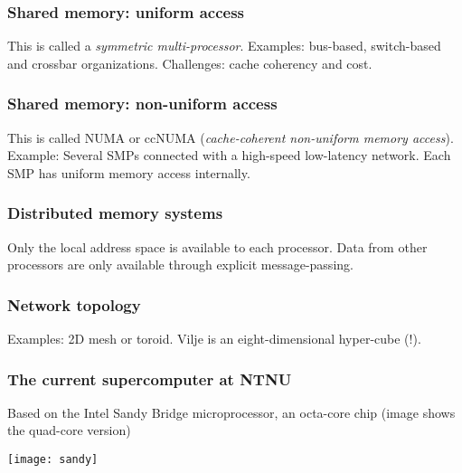 \begin{frame}
  \frametitle{Shared memory: uniform access}
  This is called a \emph{symmetric multi-processor}. Examples: bus-based,
  switch-based and crossbar organizations. Challenges: cache coherency and cost.
  \begin{center}
    \scalebox{0.6}{}
  \end{center}
\end{frame}

\begin{frame}
  \frametitle{Shared memory: non-uniform access}
  This is called NUMA or ccNUMA (\emph{cache-coherent non-uniform memory
    access}). Example: Several SMPs connected with a high-speed low-latency
  network. Each SMP has uniform memory access internally.
  \begin{center}
    
  \end{center}
\end{frame}

\begin{frame}
  \frametitle{Distributed memory systems}
  Only the local address space is available to each processor. Data from other
  processors are only available through explicit message-passing.
  \begin{center}
    
  \end{center}
\end{frame}

\begin{frame}
  \frametitle{Network topology}
  Examples: 2D mesh or toroid. Vilje is an eight-dimensional hyper-cube (!).
  \begin{center}
    
    \qquad
    
  \end{center}
\end{frame}

\begin{frame}
  \frametitle{The current supercomputer at NTNU}
  Based on the Intel Sandy Bridge microprocessor, an octa-core chip (image
  shows the quad-core version)
  \begin{center}
    \texttt{[image: sandy]}
  \end{center}
\end{frame}

